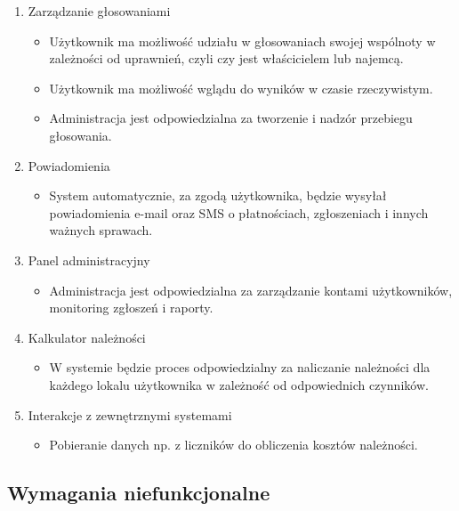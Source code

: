 \begin{enumerate}[label=\arabic*.]
\begin{itemize}
    \end{itemize}
    \item Zarządzanie głosowaniami
    \begin{itemize}
        \item Użytkownik ma możliwość udziału w głosowaniach swojej wspólnoty w zależności od uprawnień, czyli czy jest właścicielem lub najemcą.
        \item Użytkownik ma możliwość wglądu do wyników w czasie rzeczywistym.
        \item Administracja jest odpowiedzialna za tworzenie i nadzór przebiegu głosowania.
    \end{itemize}
    \item Powiadomienia
    \begin{itemize}
        \item System automatycznie, za zgodą użytkownika, będzie wysyłał powiadomienia e-mail oraz SMS o płatnościach, zgłoszeniach i innych ważnych sprawach.
    \end{itemize}
    \item Panel administracyjny
    \begin{itemize}
        \item Administracja jest odpowiedzialna za zarządzanie kontami użytkowników, monitoring zgłoszeń i raporty.
    \end{itemize}
    \item Kalkulator należności
    \begin{itemize}
        \item W systemie będzie proces odpowiedzialny za naliczanie należności dla każdego lokalu użytkownika w zależność od odpowiednich czynników.
    \end{itemize}
    \item Interakcje z zewnętrznymi systemami
    \begin{itemize}
        \item Pobieranie danych np. z liczników do obliczenia kosztów należności.
    \end{itemize}
\end{enumerate}

\subsection{Wymagania niefunkcjonalne}

